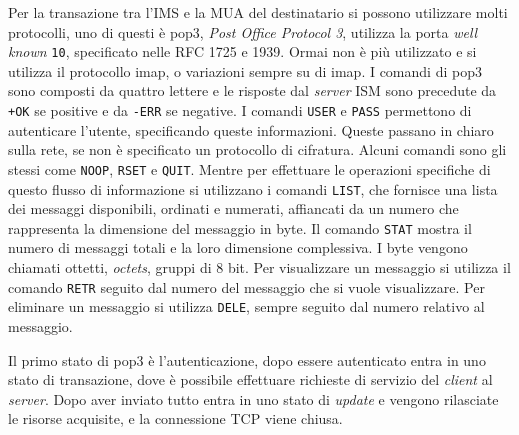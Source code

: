 \documentclass{article}
\numberwithin{equation}{subsection}
\begin{document}
Per la transazione tra l'IMS e la MUA del destinatario si possono utilizzare molti protocolli, uno di questi è pop3, \textit{Post Office Protocol 3}, utilizza la porta \textit{well known} \verb|10|, specificato nelle RFC 1725 e 1939. Ormai non è più utilizzato e si utilizza il protocollo imap, o variazioni sempre su di imap. 
I comandi di pop3 sono composti da quattro lettere e le risposte dal \textit{server} ISM sono precedute da \verb|+OK| se positive e da \verb|-ERR| se negative. I comandi \verb|USER| e \verb|PASS| permettono di autenticare l'utente, specificando queste informazioni. Queste passano in chiaro sulla rete, se non è specificato un protocollo di cifratura. 
Alcuni comandi sono gli stessi come \verb|NOOP|, \verb|RSET| e \verb|QUIT|. Mentre per effettuare le operazioni specifiche di questo flusso di informazione si utilizzano i comandi \verb|LIST|, che fornisce una lista dei messaggi disponibili, ordinati e numerati, affiancati da un numero che rappresenta la dimensione del messaggio in byte. Il comando \verb|STAT| mostra il numero di messaggi totali e la loro dimensione complessiva. 
I byte vengono chiamati ottetti, \textit{octets}, gruppi di 8 bit. 
Per visualizzare un messaggio si utilizza il comando \verb|RETR| seguito dal numero del messaggio che si vuole visualizzare. Per eliminare un messaggio si utilizza \verb|DELE|, sempre seguito dal numero relativo al messaggio. 

Il primo stato di pop3 è l'autenticazione, dopo essere autenticato entra in uno stato di transazione, dove è possibile effettuare richieste di servizio del \textit{client} al \textit{server}. Dopo aver inviato tutto entra in uno stato di \textit{update} e vengono rilasciate le risorse acquisite, e la connessione \textcolor{Bittersweet}{TCP} viene chiusa. 
\end{document}
